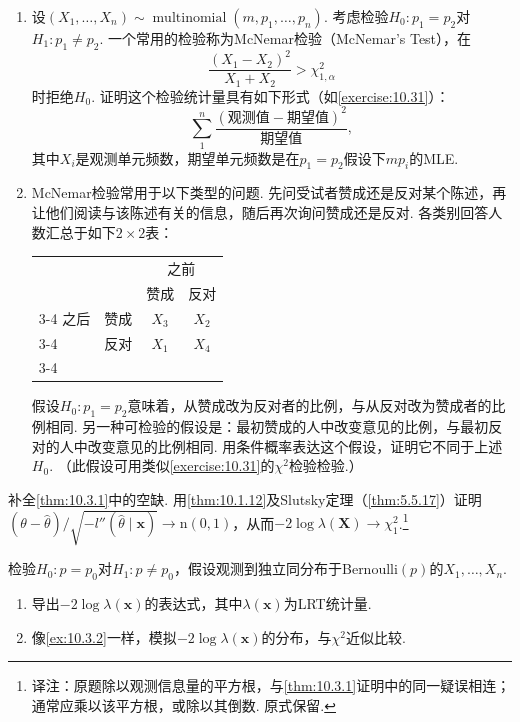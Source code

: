\begin{exercise}\label{exercise:10.32}\leavevmode
\begin{enumerate}[label=(\alph*)]
\item 设$(X_1,\ldots,X_n)\sim\operatorname{multinomial}(m,p_1,\ldots,p_n)$. 考虑检验$H_0:p_1=p_2$对$H_1:p_1\ne p_2$. 一个常用的检验称为McNemar检验（McNemar's Test），在
$$\frac{(X_1-X_2)^2}{X_1+X_2}>\chi_{1,\alpha}^2$$
时拒绝$H_0$. 证明这个检验统计量具有如下形式（如\autoref{exercise:10.31}）：
$$\sum_1^n\frac{(\text{观测值}-\text{期望值})^2}{\text{期望值}},$$
其中$X_i$是观测单元频数，期望单元频数是在$p_1=p_2$假设下$mp_i$的MLE.
\item McNemar检验常用于以下类型的问题. 先问受试者赞成还是反对某个陈述，再让他们阅读与该陈述有关的信息，随后再次询问赞成还是反对. 各类别回答人数汇总于如下$2\times2$表：
\begin{center}
\begin{tabular}{llcc}
&&\multicolumn{2}{c}{之前}\\
&&赞成&反对\\\cline{3-4}
之后&赞成&\multicolumn{1}{|c|}{$X_3$}&\multicolumn{1}{c|}{$X_2$}\\\cline{3-4}
&反对&\multicolumn{1}{|c|}{$X_1$}&\multicolumn{1}{c|}{$X_4$}\\\cline{3-4}
\end{tabular}
\end{center}
假设$H_0:p_1=p_2$意味着，从赞成改为反对者的比例，与从反对改为赞成者的比例相同. 另一种可检验的假设是：最初赞成的人中改变意见的比例，与最初反对的人中改变意见的比例相同. 用条件概率表达这个假设，证明它不同于上述$H_0$. （此假设可用类似\autoref{exercise:10.31}的$\chi^2$检验检验.）
\end{enumerate}
\end{exercise}

\begin{exercise}\label{exercise:10.33}
补全\autoref{thm:10.3.1}中的空缺. 用\autoref{thm:10.1.12}及Slutsky定理（\autoref{thm:5.5.17}）证明$(\theta-\hat\theta)/\sqrt{-l''(\hat\theta\mid\boldsymbol x)}\to\mathrm n(0,1)$，从而$-2\log\lambda(\boldsymbol X)\to\chi_1^2$.\footnote{译注：原题除以观测信息量的平方根，与\autoref{thm:10.3.1}证明中的同一疑误相连；通常应乘以该平方根，或除以其倒数. 原式保留.}
\end{exercise}

\begin{exercise}\label{exercise:10.34}
检验$H_0:p=p_0$对$H_1:p\ne p_0$，假设观测到独立同分布于Bernoulli$(p)$的$X_1,\ldots,X_n$.
\begin{enumerate}[label=(\alph*)]
\item 导出$-2\log\lambda(\boldsymbol x)$的表达式，其中$\lambda(\boldsymbol x)$为LRT统计量.
\item 像\autoref{ex:10.3.2}一样，模拟$-2\log\lambda(\boldsymbol x)$的分布，与$\chi^2$近似比较.
\end{enumerate}
\end{exercise}

